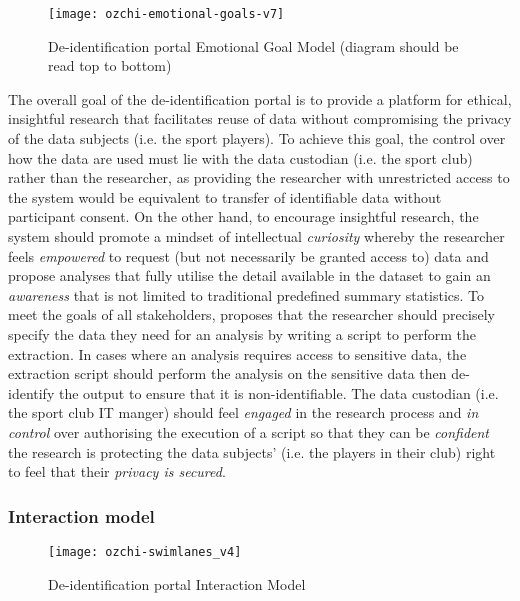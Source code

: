 \begin{landscape}
\begin{figure}[h]
  \centering
  \texttt{[image: ozchi-emotional-goals-v7]}
  \caption{De-identification portal Emotional Goal Model (diagram should be read top to bottom)}
  \label{fig:deident-emotional-goals}
\end{figure}
\end{landscape}

The overall goal of the de-identification portal is to provide a
platform for ethical, insightful research that facilitates reuse of data
without compromising the privacy of the data subjects (i.e. the sport
players). To achieve this goal, the control over how the data are used
must lie with the data custodian (i.e. the sport club) rather than the
researcher, as providing the researcher with unrestricted access to the
system would be equivalent to transfer of identifiable data without
participant consent. On the other hand, to encourage insightful
research, the system should promote a mindset of intellectual
\emph{curiosity} whereby the researcher feels \emph{empowered} to
request (but not necessarily be granted access to) data and propose
analyses that fully utilise the detail available in the dataset to gain
an \emph{awareness} that is not limited to traditional predefined
summary statistics. To meet the goals of all stakeholders,  proposes that the researcher should precisely specify the data they need for an analysis by writing a script to perform the extraction. In cases where
an analysis requires access to sensitive data, the extraction script
should perform the analysis on the sensitive data then de-identify the
output to ensure that it is non-identifiable. The data custodian (i.e.
the sport club IT manger) should feel \emph{engaged} in the research
process and \emph{in control} over authorising the execution of a script
so that they can be \emph{confident} the research is protecting the data
subjects' (i.e. the players in their club) right to feel that their
\emph{privacy is secured}.

\subsubsection{Interaction model}\label{sec:deidentify-interactionmodel}

\begin{figure}[htp]
  \centering
  \texttt{[image: ozchi-swimlanes\_v4]}
  \caption{De-identification portal Interaction Model}
  \label{fig:deident-swimlanes}
\end{figure}

